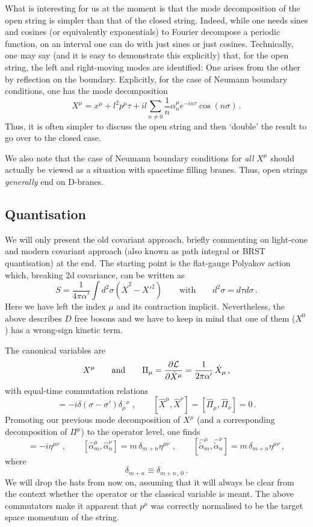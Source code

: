 \documentclass[12pt]{article}
\newcommand{\be}{\begin{equation}}
\newcommand{\ee}{\end{equation}}
\numberwithin{equation}{section}
\begin{document}
What is interesting for us at the moment is that the mode decomposition of the open string is simpler than that of the closed string. Indeed, while one needs sines and cosines (or equivalently exponentials) to Fourier decompose a periodic function, on an interval one can do with just sines or just cosines. Technically, one may say (and it is easy to demonstrate this explicitly) that, for the open string, the left and right-moving modes are identified: One arises from the other by reflection on the boundary. Explicitly, for the case of Neumann boundary conditions, one has the mode decomposition
\be
X^\mu=x^\mu+l^2p^\mu\tau+il\sum_{n\neq 0}\frac{1}{n}\alpha_n^\mu e^{-in\tau}\cos(n\sigma)\,.
\ee
Thus, it is often simpler to discuss the open string and then `double' the result to go over to the closed case. 

We also note that the case of Neumann boundary conditions for {\it all} $X^\mu$ should actually be viewed as a situation with spacetime filling branes. Thus, open strings {\it generally} end on D-branes.






\subsection{Quantisation}

We will only present the old covariant approach, briefly commenting on light-cone and modern covariant approach (also known as path integral or BRST quantisation) at the end. The starting point is the flat-gauge Polyakov action which, breaking 2d covariance, can be written as
\be
S=\frac{1}{4\pi\alpha'}\int d^2\sigma (\dot{X}^2-X'^2)\qquad \mbox{with}\qquad 
d^2\sigma =d\tau d\sigma\,.
\ee
Here we have left the index $\mu$ and its contraction implicit. Nevertheless, the above describes $D$ free bosons and we have to keep in mind that one of them ($X^0$) has a wrong-sign kinetic term.

The canonical variables are 
\be
X^\mu \qquad \mbox{and} \qquad \Pi_\mu=\frac{\partial {\cal L}}{\partial \dot{X}^\mu}=\frac{1}{2\pi \alpha'}\,\dot{X}_\mu\,,
\ee
with equal-time commutation relations
\be
[\hat{\Pi}_\mu(\tau,\sigma),\,\hat{X}^\nu(\tau,\sigma')] = -i\delta(\sigma-\sigma')\delta_\mu{}^\nu\,\,,\qquad [\hat{X}^\mu,\hat{X}^\nu]=[\hat{\Pi}_\mu,\hat{\Pi}_\nu]=0\,.
\ee
Promoting our previous mode decomposition of $X^\mu$ (and a corresponding decomposition of $\Pi^\mu$) to the operator level, one finds
\be
[\hat{p}^\mu,\hat{x}^\nu]=-i\eta^{\mu\nu}\,\,,\qquad
[\hat{\alpha}_m^\mu,\hat{\alpha}_n^\nu]=m\,\delta_{m+n}\eta^{\mu\nu}\,\,,\qquad
[\hat{\tilde{\alpha}}_m^\mu,\hat{\tilde{\alpha}}_n^\nu]=m\,\delta_{m+n} \eta^{\mu\nu}\,,
\ee
where
\be
\delta_{m+n}\equiv \delta_{m+n\,,\,0}\,.
\ee
We will drop the hats from now on, assuming that it will always be clear from the context whether the operator or the classical variable is meant. The above commutators make it apparent that $p^\mu$ was correctly normalised to be the target space momentum of the string.
\end{document}
